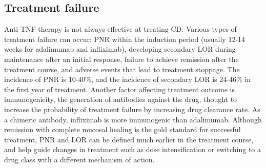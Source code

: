 \begin{outline}

\subsection{Treatment failure}

Anti-\gls{TNF} therapy is not always effective at treating \gls{CD}.
Various types of treatment failure can occur:
\gls{PNR} within the induction period (usually 12-14 weeks for adalimumab and infliximab), developing secondary \gls{LOR} during maintenance after an initial response, failure to achieve remission after the treatment course, and adverse events that lead to treatment stoppage\autocite{roda2016LossResponseAntiTNFs}.
The incidence of \gls{PNR} is 10-40\%, and the incidence of secondary \gls{LOR} is 24-46\% in the first year of treatment\autocite{ben-horin2014OptimizingAntiTNFTreatments,flamant2018InflammatoryBowelDisease,kennedy2019PredictorsAntiTNFTreatment}.
Another factor affecting treatment outcome is immunogenicity, the generation of antibodies against the drug, 
thought to increase the probability of treatment failure by increasing drug clearance rate\autocite{lichtenstein2013ComprehensiveReviewAntitumor,kennedy2019PredictorsAntiTNFTreatment}.
As a chimeric antibody, infliximab is more immunogenic than adalimumab\autocite{vermeire2018ImmunogenicityBiologicsInflammatory,kennedy2019PredictorsAntiTNFTreatment}.
Although remission with complete mucosal healing is the gold standard for successful treatment\autocite{roda2020CrohnDisease}, \gls{PNR} and \gls{LOR} can be defined much earlier in the treatment course, and help guide changes in treatment such as dose intensification or switching to a drug class with a different mechanism of action\autocite{lichtenstein2013ComprehensiveReviewAntitumor,ben-horin2014OptimizingAntiTNFTreatments}.


\end{outline}
